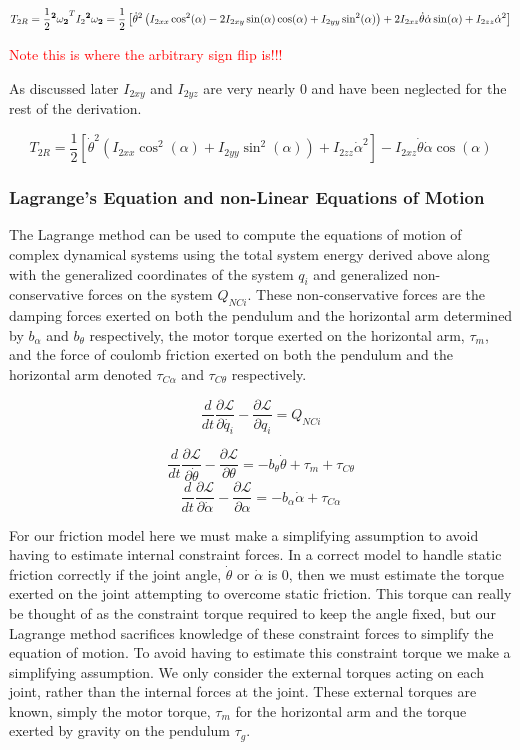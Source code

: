 \documentclass{article}
\newcommand{\xxx}[1]{\textcolor{red}{#1}}
\theoremstyle{plain}
\theoremstyle{definition}
\theoremstyle{remark}
\newcommand{\Lagr}{\mathcal{L}}
\begin{document}
$$ T_{2R} = \frac{1}{2} {\bf{^2\omega_{2}}}^T I_{2} {\bf{ ^2 \omega_{2}}} = \frac{1}{2} \left[ \dot{\theta}^2 \left(I_{2xx} \cos^2(\alpha) - 2 I_{2xy} \sin(\alpha)  \cos(\alpha) + I_{2yy}  \sin^2(\alpha)  \right) + 2 I_{2xz} \dot{\theta} \dot{\alpha} \sin(\alpha) + I_{2zz} \dot{\alpha}^2 \right]$$

\xxx{Note this is where the arbitrary sign flip is!!!}

As discussed later $I_{2xy}$ and $I_{2yz}$ are very nearly $0$ and have been neglected for the rest of the derivation.

$$T_{2R} = \frac{1}{2} \left[ \dot{\theta}^2 \left( I_{2xx} \cos^2(\alpha) + I_{2yy} \sin^2(\alpha) \right) + I_{2zz} \dot{\alpha}^2 \right] - I_{2xz} \dot{\theta} \dot{\alpha} \cos(\alpha) $$

\subsubsection*{Lagrange's Equation and non-Linear Equations of Motion}
The Lagrange method can be used to compute the equations of motion of complex dynamical systems using the total system energy derived above along with the generalized coordinates of the system $q_{i}$ and generalized non-conservative forces on the system $Q_{NCi}$.  These non-conservative forces are the damping forces exerted on both the pendulum and the horizontal arm determined by $b_\alpha$ and $b_\theta$ respectively,  the motor torque exerted on the horizontal arm, $\tau_{m}$, and the force of coulomb friction exerted on both the pendulum and the horizontal arm denoted $\tau_{C \alpha}$ and $\tau_{C \theta}$ respectively.  

$$ \frac{d}{dt} \frac{\partial \Lagr}{\partial \dot{q_i}} - \frac{\partial \Lagr}{\partial q_i} = Q_{NCi} $$

$$ \frac{d}{dt} \frac{\partial \Lagr}{\partial \dot{\theta}} - \frac{\partial \Lagr}{\partial \theta} = -b_{\theta} \dot{\theta} + \tau_m + \tau_{C \theta}  $$
\begin{equation}
 \frac{d}{dt} \frac{\partial \Lagr}{\partial \dot{\alpha}} - \frac{\partial \Lagr}{\partial \alpha} = -b_{\alpha} \dot{\alpha} + \tau_{C \alpha} 
\end{equation}


For our friction model here we must make a simplifying assumption to avoid having to estimate internal constraint forces.  In a correct model to handle static friction correctly if the joint angle, $\dot{\theta}$ or $\dot{\alpha}$ is $0$, then we must estimate the torque exerted on the joint attempting to overcome static friction.  This torque can really be thought of as the constraint torque required to keep the angle fixed, but our Lagrange method sacrifices knowledge of these constraint forces to simplify the equation of motion.  To avoid having to estimate this constraint torque we make a simplifying assumption.  We only consider the external torques acting on each joint, rather than the internal forces at the joint.  These external torques are known, simply the motor torque, $\tau_m$ for the horizontal arm and the torque exerted by gravity on the pendulum $\tau_g$.
\end{document}
